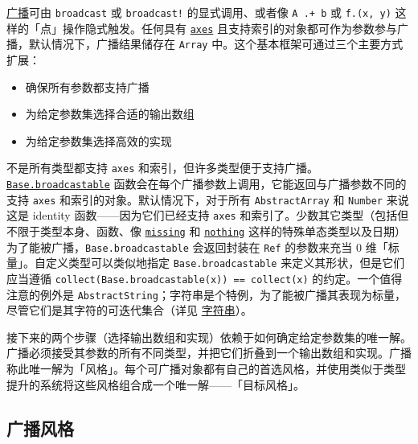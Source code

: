 \hyperlink{10888979137852348176}{广播}可由 \texttt{broadcast} 或 \texttt{broadcast!} 的显式调用、或者像 \texttt{A .+ b} 或 \texttt{f.(x, y)} 这样的「点」操作隐式触发。任何具有 \hyperlink{7074821531920287868}{\texttt{axes}} 且支持索引的对象都可作为参数参与广播，默认情况下，广播结果储存在 \texttt{Array} 中。这个基本框架可通过三个主要方式扩展：



\begin{itemize}
\item 确保所有参数都支持广播


\item 为给定参数集选择合适的输出数组


\item 为给定参数集选择高效的实现

\end{itemize}


不是所有类型都支持 \texttt{axes} 和索引，但许多类型便于支持广播。\hyperlink{3229213625072672556}{\texttt{Base.broadcastable}} 函数会在每个广播参数上调用，它能返回与广播参数不同的支持 \texttt{axes} 和索引的对象。默认情况下，对于所有 \texttt{AbstractArray} 和 \texttt{Number} 来说这是 identity 函数——因为它们已经支持 \texttt{axes} 和索引了。少数其它类型（包括但不限于类型本身、函数、像 \hyperlink{14596725676261444434}{\texttt{missing}} 和 \hyperlink{9331422207248206047}{\texttt{nothing}} 这样的特殊单态类型以及日期）为了能被广播，\texttt{Base.broadcastable} 会返回封装在 \texttt{Ref} 的参数来充当 0 维「标量」。自定义类型可以类似地指定 \texttt{Base.broadcastable} 来定义其形状，但是它们应当遵循 \texttt{collect(Base.broadcastable(x)) == collect(x)} 的约定。一个值得注意的例外是 \texttt{AbstractString}；字符串是个特例，为了能被广播其表现为标量，尽管它们是其字符的可迭代集合（详见 \href{@id man-strings}{字符串}）。



接下来的两个步骤（选择输出数组和实现）依赖于如何确定给定参数集的唯一解。广播必须接受其参数的所有不同类型，并把它们折叠到一个输出数组和实现。广播称此唯一解为「风格」。每个可广播对象都有自己的首选风格，并使用类似于类型提升的系统将这些风格组合成一个唯一解——「目标风格」。



\hypertarget{5448969838863032993}{}


\subsection{广播风格}



